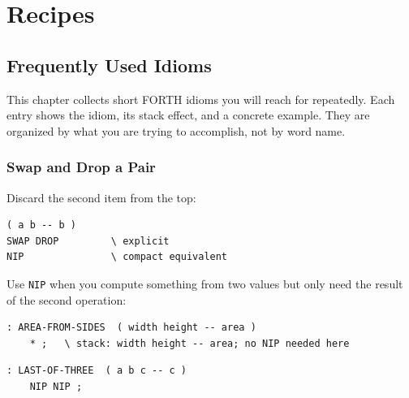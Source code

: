 
\part{Recipes}

\chapter{Frequently Used Idioms}
\label{chap:idioms}

This chapter collects short FORTH idioms you will reach for repeatedly. Each
entry shows the idiom, its stack effect, and a concrete example. They are
organized by what you are trying to accomplish, not by word name.

\section{Swap and Drop a Pair}
\label{sec:idiom-nip}

Discard the second item from the top:

\begin{lstlisting}[language=Forth]
( a b -- b )
SWAP DROP         \ explicit
NIP               \ compact equivalent
\end{lstlisting}

Use \texttt{NIP} when you compute something from two values but only need the
result of the second operation:

\begin{lstlisting}[language=Forth]
: AREA-FROM-SIDES  ( width height -- area )
    * ;   \ stack: width height -- area; no NIP needed here
\end{lstlisting}

\begin{lstlisting}[language=Forth]
: LAST-OF-THREE  ( a b c -- c )
    NIP NIP ;
\end{lstlisting}

